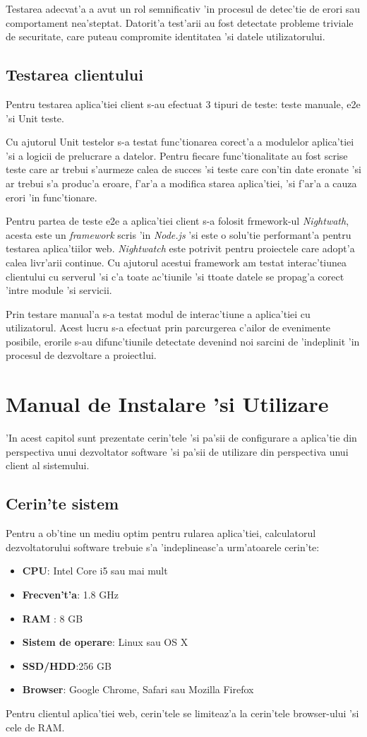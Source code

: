 \documentclass[12pt,a4paper,twoside]{report}
\begin{document}
Testarea adecvat'a a avut un rol semnificativ 'in procesul de detec'tie de erori sau comportament nea'steptat. Datorit'a test'arii au fost detectate probleme triviale de securitate, care puteau compromite identitatea 'si datele utilizatorului.


\section{Testarea clientului}
Pentru testarea aplica'tiei client s-au efectuat 3 tipuri de teste: teste manuale, e2e 'si Unit teste. 

Cu ajutorul Unit testelor s-a testat func'tionarea corect'a a modulelor aplica'tiei 'si a logicii de prelucrare a datelor. Pentru fiecare func'tionalitate au fost scrise teste care ar trebui s'aurmeze calea de succes 'si teste care con'tin date eronate 'si ar trebui s'a produc'a eroare, f'ar'a a modifica starea aplica'tiei, 'si f'ar'a a cauza erori 'in func'tionare.

Pentru partea de teste e2e a aplica'tiei client s-a folosit frmework-ul \textit{Nightwath}, acesta este un \textit{framework} scris 'in \textit{Node.js} 'si este o solu'tie performant'a pentru testarea aplica'tiilor web. \textit{Nightwatch} este potrivit pentru proiectele care adopt'a calea livr'arii continue. Cu ajutorul acestui framework  am testat interac'tiunea clientului cu serverul 'si c'a toate ac'tiunile 'si ttoate datele se propag'a corect 'intre module 'si servicii.

Prin testare manual'a s-a testat modul de interac'tiune a aplica'tiei cu utilizatorul. Acest lucru s-a efectuat prin parcurgerea c'ailor de evenimente posibile, erorile s-au difunc'tiunile detectate devenind noi sarcini de 'indeplinit 'in procesul de dezvoltare a proiectlui.

\chapter{Manual de Instalare 'si Utilizare}
'In acest capitol sunt prezentate cerin'tele 'si pa'sii de configurare a aplica'tie din perspectiva unui dezvoltator software 'si pa'sii de utilizare din perspectiva unui client al sistemului.
\section{Cerin'te sistem}
Pentru a ob'tine un mediu optim pentru rularea aplica'tiei, calculatorul dezvoltatorului software trebuie s'a 'indeplineasc'a urm'atoarele cerin'te:
\begin{itemize}
\item \textbf{CPU}: Intel Core i5 sau mai mult
\item  \textbf{Frecven't'a}: 1.8 GHz
\item  \textbf{RAM} : 8 GB
\item  \textbf{Sistem de operare}: Linux sau OS X
\item  \textbf{SSD/HDD}:256 GB
\item  \textbf{Browser}: Google Chrome, Safari sau Mozilla Firefox
\end{itemize}
Pentru clientul aplica'tiei web, cerin'tele se limiteaz'a la cerin'tele browser-ului 'si cele de RAM.
\end{document}
